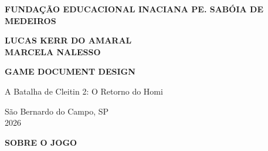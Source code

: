 \documentclass[12pt,a4paper]{article}
\begin{document}
\thispagestyle{empty} 

\begin{center}

\textbf{FUNDAÇÃO EDUCACIONAL INACIANA PE. SABÓIA DE MEDEIROS}

\vspace{3cm}

\textbf{LUCAS KERR DO AMARAL} \\
\textbf{MARCELA NALESSO}

\vfill

\textbf{GAME DOCUMENT DESIGN}

\vspace{0.5cm}

A Batalha de Cleitin 2: O Retorno do Homi

\vfill

São Bernardo do Campo, SP \\
2026

\end{center}

\newpage

\textbf{SOBRE O JOGO}
\end{document}
